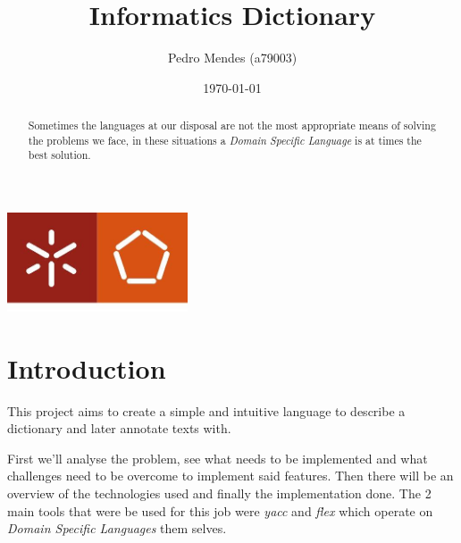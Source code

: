 \documentclass[a4paper]{report}
\begin{document}
\title{Informatics Dictionary}
\author{Pedro Mendes (a79003)}
\date{\today}

\begin{center}
    \begin{minipage}{0.75\linewidth}
        \centering
        \includegraphics[width=0.4\textwidth]{eng.jpeg}\par\vspace{1cm}
        \vspace{1.5cm}
        \href{https://www.uminho.pt/PT}
        {\color{black}{\scshape\LARGE Universidade do Minho}} \par
        \vspace{1cm}
        \href{https://www.di.uminho.pt/}
        {\color{black}{\scshape\Large Departamento de Informática}} \par
        \vspace{1.5cm}
        \maketitle
    \end{minipage}
\end{center}

\begin{abstract}
    \begin{center}
        Sometimes the languages at our disposal are not the most appropriate
        means of solving the problems we face, in these situations a
        \textit{Domain Specific Language} is at times the best solution.
    \end{center}
\end{abstract}

\tableofcontents

\pagebreak

\chapter{Introduction}

This project aims to create a simple and intuitive language to describe a
dictionary and later annotate texts with.

First we'll analyse the problem, see what needs to be implemented and what
challenges need to be overcome to implement said features. Then there will be
an overview of the technologies used and finally the implementation done. The 2
main tools that were be used for this job were \textit{yacc} and \textit{flex}
which operate on \textit{Domain Specific Languages} them selves.
\end{document}
